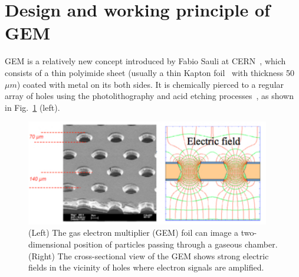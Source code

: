 \section{Design and working principle of GEM} %
\label{sec:design_and_working_principle_of_gem}

GEM is a relatively new concept introduced by Fabio Sauli at CERN~\cite{Sauli1997}, which consists of a thin polyimide sheet (usually a thin Kapton foil~\cite{Kapton-sheet} with thickness 50 $\mu m$) coated with metal on its both sides. It is chemically pierced to a regular array of holes using the photolithography and acid etching processes~\cite{Benlloch1998}, as shown in Fig.~\ref{fig:gem} (left).
\begin{figure}[!htbp]
    \centering
    \includegraphics[width=0.95\textwidth]{figures/GEM/KEKDTP3.jpg}
    \caption{(Left) The gas electron multiplier (GEM) foil can image a two-dimensional position of particles passing through a gaseous chamber. (Right) The cross-sectional view of the GEM shows strong electric fields in the vicinity of holes where electron signals are amplified.}
    \label{fig:gem}
\end{figure}

